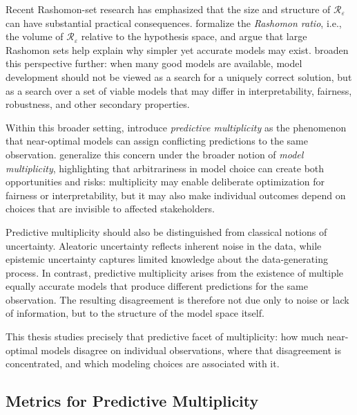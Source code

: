 Recent Rashomon-set research has emphasized that the size and structure of
$\mathcal{R}_\varepsilon$ can have substantial practical consequences.
\cite{semenova_existence_2022} formalize the \emph{Rashomon ratio}, i.e., the volume of
$\mathcal{R}_\varepsilon$ relative to the hypothesis space, and argue that large Rashomon
sets help explain why simpler yet accurate models may exist.
\cite{rudin_amazing_2024} broaden this perspective further: when many good models are
available, model development should not be viewed as a search for a uniquely correct
solution, but as a search over a set of viable models that may differ in interpretability,
fairness, robustness, and other secondary properties.

Within this broader setting, \cite{marx_predictive_2020} introduce
\emph{predictive multiplicity} as the phenomenon that near-optimal models can assign
conflicting predictions to the same observation.
\cite{black_model_2022} generalize this concern under the broader notion of
\emph{model multiplicity}, highlighting that arbitrariness in model choice can create
both opportunities and risks: multiplicity may enable deliberate optimization for fairness
or interpretability, but it may also make individual outcomes depend on choices that are
invisible to affected stakeholders.

Predictive multiplicity should also be distinguished from classical notions of
uncertainty. Aleatoric uncertainty reflects inherent noise in the data, while epistemic
uncertainty captures limited knowledge about the data-generating process. In contrast,
predictive multiplicity arises from the existence of multiple equally accurate models
that produce different predictions for the same observation. The resulting disagreement
is therefore not due only to noise or lack of information, but to the structure of the
model space itself.

This thesis studies precisely that predictive facet of multiplicity: how much near-optimal
models disagree on individual observations, where that disagreement is concentrated, and
which modeling choices are associated with it.

\subsection{Metrics for Predictive Multiplicity}
\label{sec:metrics-review}

